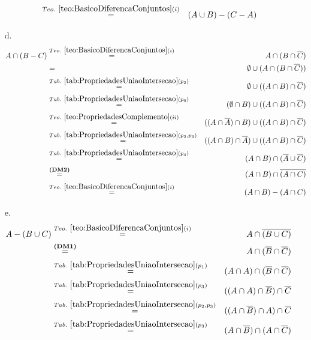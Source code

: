 \begin{prova}
\begin{itemize}
\begin{eqnarray*}
			& \stackrel{Teo. \  \ref{teo:BasicoDiferencaConjuntos}(i)}{=}& (A \cup B) - (C - A)\\
		\end{eqnarray*}
		\item[d.]
		\begin{eqnarray*}
			A \cap (B - C) & \stackrel{Teo. \  \ref{teo:BasicoDiferencaConjuntos}(i)}{=}& A \cap (B \cap \overline{C})\\
			& = & \emptyset \cup ( A \cap (B \cap \overline{C}))\\
			& \stackrel{Tab. \ \ref{tab:PropriedadesUniaoIntersecao}(p_2)}{=} & \emptyset \cup ( (A \cap B) \cap \overline{C})\\
			& \stackrel{Tab. \ \ref{tab:PropriedadesUniaoIntersecao}(p_6)}{=} & (\emptyset \cap B) \cup ( (A \cap B) \cap \overline{C})\\
			& \stackrel{Teo. \ \ref{teo:PropriedadesComplemento}(ii)}{=} & ((A \cap \overline{A}) \cap B) \cup ( (A \cap B) \cap \overline{C})\\
			& \stackrel{Tab. \ \ref{tab:PropriedadesUniaoIntersecao}(p_2, p_3)}{=} & ((A \cap B) \cap \overline{A}) \cup ( (A \cap B) \cap \overline{C})\\
			& \stackrel{Tab. \ \ref{tab:PropriedadesUniaoIntersecao}(p_4)}{=}& (A \cap B) \cap (\overline{A} \cup \overline{C})\\
			& \stackrel{\textbf{(DM2)}}{=}& (A \cap B) \cap \overline{(A \cap C)}\\
			& \stackrel{Teo. \  \ref{teo:BasicoDiferencaConjuntos}(i)}{=}& (A \cap B) - (A \cap C)
		\end{eqnarray*}
		\item[e.]
		\begin{eqnarray*}
			A - (B \cup C) & \stackrel{Teo. \  \ref{teo:BasicoDiferencaConjuntos}(i)}{=}& A \cap \overline{(B \cup C)}\\
			& \stackrel{\textbf{(DM1)}}{=}& A \cap (\overline{B} \cap \overline{C})\\
			& \stackrel{Tab. \ \ref{tab:PropriedadesUniaoIntersecao}(p_1)}{=}& (A \cap A) \cap (\overline{B} \cap \overline{C})\\
			& \stackrel{Tab. \ \ref{tab:PropriedadesUniaoIntersecao}(p_3)}{=}& ((A \cap A) \cap \overline{B}) \cap \overline{C}\\
			& \stackrel{Tab. \ \ref{tab:PropriedadesUniaoIntersecao}(p_2, p_3)}{=}& ((A \cap \overline{B}) \cap A) \cap \overline{C}\\
			& \stackrel{Tab. \ \ref{tab:PropriedadesUniaoIntersecao}(p_3)}{=}& (A \cap \overline{B}) \cap (A \cap \overline{C})\\

\end{eqnarray*}
\end{itemize}
\end{prova}
